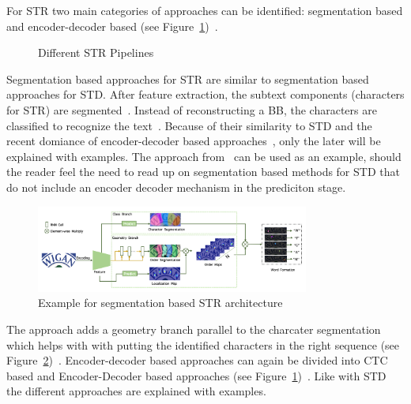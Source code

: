 For \ac{STR} two main categories of approaches can be identified: segmentation based and
encoder-decoder based (see Figure~\ref{fig:str-pipelines})~\citep{chen_text_2021}.
\begin{figure}[h]
    \centering
    
    \caption{Different STR Pipelines\label{fig:str-pipelines}}
\end{figure}
Segmentation based approaches for \ac{STR} are similar to segmentation based approaches for \ac{STD}.
After feature extraction, the subtext components (characters for \ac{STR}) are
segmented~\citep{chen_text_2021}.
Instead of reconstructing a \ac{BB}, the characters are classified to recognize the
text~\citep{chen_text_2021}.
Because of their similarity to \ac{STD} and the recent domiance of encoder-decoder based
approaches~\citep{chen_text_2021,long_scene_2021}, only the later will be explained with examples.
The approach from~\cite{wan_textscanner_2020} can be used as an example, should the reader feel the
need to read up on segmentation based methods for \ac{STD} that do not include an encoder decoder
mechanism in the prediciton stage.
\begin{figure}[h]
    \centering
    \includegraphics[width=0.8\textwidth]{img/STR-seg-based-wan-textscaner-2020.png}
    \caption[Segmentation based STR architecture]{%
        Example for segmentation based STR
        architecture~\citep{wan_textscanner_2020}\label{fig:STR-segbased-architecture}
    }
\end{figure}
The approach adds a geometry branch parallel to the charcater segmentation which helps with with
putting the identified characters in the right sequence (see
Figure~\ref{fig:STR-segbased-architecture})~\citep{wan_textscanner_2020}.
Encoder-decoder based approaches can again be divided into CTC based and Encoder-Decoder based
approaches (see Figure~\ref{fig:str-pipelines})~\citep{long_scene_2021,cong_comparative_2019}.
Like with \ac{STD} the different approaches are explained with examples.

